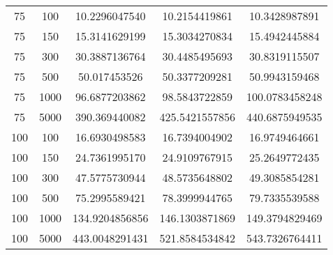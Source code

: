 \begin{appendices}
\begin{center}
\begin{longtable}{c c S[table-format=3.10] S[table-format=3.10] S[table-format=3.10]}
				75	&	100		&	10.2296047540	&	10.2154419861	&	10.3428987891	\\
				75	&	150		&	15.3141629199	&	15.3034270834	&	15.4942445884	\\
				75	&	300		&	30.3887136764	&	30.4485495693	&	30.8319115507	\\
				75	&	500		&	50.017453526	&	50.3377209281	&	50.9943159468	\\
				75	&	1000	&	96.6877203862	&	98.5843722859	&	100.0783458248	\\
				75	&	5000	&	390.369440082	&	425.5421557856	&	440.6875949535	\\

				100	&	100		&	16.6930498583	&	16.7394004902	&	16.9749464661	\\
				100	&	150		&	24.7361995170	&	24.9109767915	&	25.2649772435	\\
				100	&	300		&	47.5775730944	&	48.5735648802	&	49.3085854281	\\
				100	&	500		&	75.2995589421	&	78.3999944765	&	79.7335539588	\\
				100	&	1000	&	134.9204856856	&	146.1303871869	&	149.3794829469	\\
				100	&	5000	&	443.0048291431	&	521.8584534842	&	543.7326764411	\\
			\end{longtable}
		\end{center}

		\def\arraystretch{1.00}	%

		\blindtext[10]

\end{appendices}
